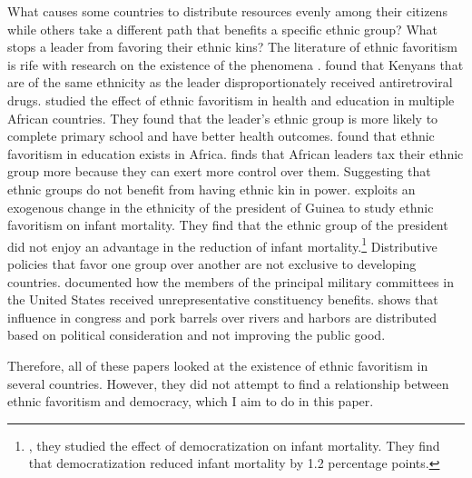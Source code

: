 \documentclass{wptemp}
\begin{document}
What causes some countries to distribute resources evenly among their citizens while others take a different path that benefits a specific ethnic group? What stops a leader from favoring their ethnic kins? The literature of ethnic favoritism is rife with research on the existence of the phenomena \citep{friedman2018corruption, franck2012does, hodler2014regional, kramon2013benefits}. \citet{friedman2018corruption} found that Kenyans that are of the same ethnicity as the leader disproportionately received antiretroviral drugs. \citet{franck2012does} studied the effect of ethnic favoritism in health and education in multiple African countries. They found that the leader's ethnic group is more likely to complete primary school and have better health outcomes. \citet{kramon2013benefits} found that ethnic favoritism in education exists in Africa. \citet{kasara2007tax} finds that African leaders tax their ethnic group more because they can exert more control over them. Suggesting that ethnic groups do not benefit from having ethnic kin in power. \citet{kudamatsu2009ethnic} exploits an exogenous change in the ethnicity of the president of Guinea to study ethnic favoritism on infant mortality. They find that the ethnic group of the president did not enjoy an advantage in the reduction of infant mortality.\footnote{\citet{kudamatsu2012has}, they studied the effect of democratization on infant mortality. They find that democratization reduced infant mortality by 1.2 percentage points.} Distributive policies that favor one group over another are not exclusive to developing countries. \citet{goss1972military} documented how the members of the principal military committees in the United States received unrepresentative constituency benefits. \citet{ferejohn1974pork}  shows that influence in congress and pork barrels over rivers and harbors are distributed based on political consideration and not improving the public good.

Therefore, all of these papers looked at the existence of ethnic favoritism in several countries. However, they did not attempt to find a relationship between ethnic favoritism and democracy, which I aim to do in this paper.
\end{document}
